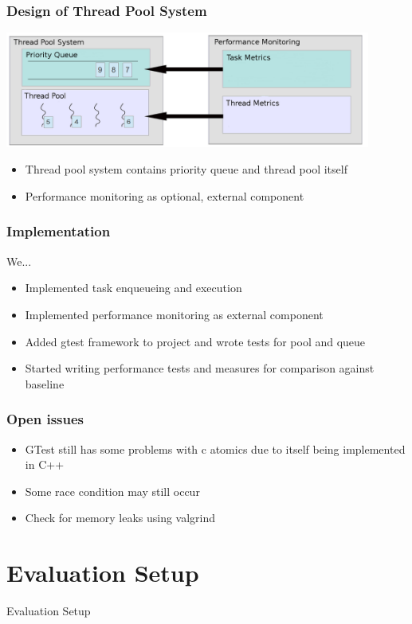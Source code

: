 \documentclass{beamer}
\begin{document}
\begin{frame}
	\frametitle{Design of Thread Pool System}
	\begin{center}
		\includegraphics[width=0.9\textwidth]{img/pool_structure.png}
	\end{center}
	\begin{itemize}
		\item Thread pool system contains priority queue and thread pool itself
		\item Performance monitoring as optional, external component
	\end{itemize}
\end{frame}

\begin{frame}
	\frametitle{Implementation}
	We...
	\begin{itemize}
		\item Implemented task enqueueing and execution
		\item Implemented performance monitoring as external component
		\item Added gtest framework to project and wrote tests for pool and queue
		\item Started writing performance tests and measures for comparison against baseline
	\end{itemize}
\end{frame}

\begin{frame}
	\frametitle{Open issues}
	\begin{itemize}
		\item GTest still has some problems with c atomics due to itself being implemented in C++
		\item Some race condition may still occur
		\item Check for memory leaks using valgrind
	\end{itemize}
\end{frame}

\section{Evaluation Setup}
\begin{frame}
	\begin{center}
		\huge Evaluation Setup
	\end{center}
\end{frame}
\end{document}
